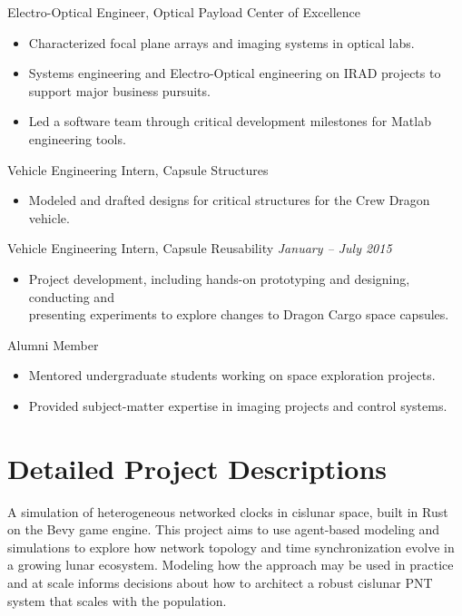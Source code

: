 \documentclass[10pt,final,sans]{resume}
\begin{document}
Electro-Optical Engineer, Optical Payload Center of Excellence
\begin{itemize}
  \item Characterized focal plane arrays and imaging systems in optical labs.
  \item Systems engineering and Electro-Optical engineering on IRAD projects to
  support major business pursuits.
  \item Led a software team through critical development milestones for Matlab
  engineering tools.
\end{itemize}
Vehicle Engineering Intern, Capsule Structures
\begin{itemize}
  \item Modeled and drafted designs for critical structures for the Crew Dragon
  vehicle.
\end{itemize}

Vehicle Engineering Intern, Capsule Reusability \hfill {\it January -- July 2015}
\begin{itemize}
  \item Project development, including hands-on prototyping and designing,
  conducting and \\
  presenting experiments to explore changes to Dragon Cargo space capsules.
\end{itemize}

Alumni Member
\begin{itemize}
  \item Mentored undergraduate students working on space exploration projects.
  \item Provided subject-matter expertise in imaging projects and control systems.
\end{itemize}

\break
\section{Detailed Project Descriptions}
 A simulation of heterogeneous networked clocks in cislunar space, built in
Rust on the Bevy game engine. This project aims to use agent-based modeling and
simulations to explore how network topology and time synchronization evolve in a
growing lunar ecosystem. Modeling how the approach may be used in practice and
at scale informs decisions about how to architect a robust cislunar PNT system
that scales with the population.
\end{document}

